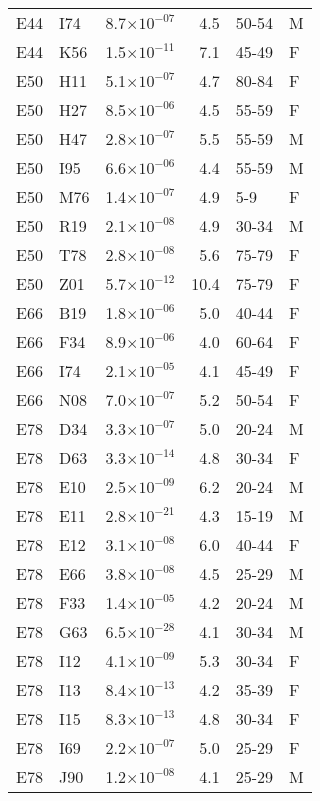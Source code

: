 \begin{longtable}{lllrll}
   E44 & I74 & 8.7$\times10^{-07}$ & 4.5 & 50-54 & M \\ 
   E44 & K56 & 1.5$\times10^{-11}$ & 7.1 & 45-49 & F \\ 
   E50 & H11 & 5.1$\times10^{-07}$ & 4.7 & 80-84 & F \\ 
   E50 & H27 & 8.5$\times10^{-06}$ & 4.5 & 55-59 & F \\ 
   E50 & H47 & 2.8$\times10^{-07}$ & 5.5 & 55-59 & M \\ 
   E50 & I95 & 6.6$\times10^{-06}$ & 4.4 & 55-59 & M \\ 
   E50 & M76 & 1.4$\times10^{-07}$ & 4.9 & 5-9 & F \\ 
   E50 & R19 & 2.1$\times10^{-08}$ & 4.9 & 30-34 & M \\ 
   E50 & T78 & 2.8$\times10^{-08}$ & 5.6 & 75-79 & F \\ 
   E50 & Z01 & 5.7$\times10^{-12}$ & 10.4 & 75-79 & F \\ 
   E66 & B19 & 1.8$\times10^{-06}$ & 5.0 & 40-44 & F \\ 
   E66 & F34 & 8.9$\times10^{-06}$ & 4.0 & 60-64 & F \\ 
   E66 & I74 & 2.1$\times10^{-05}$ & 4.1 & 45-49 & F \\ 
   E66 & N08 & 7.0$\times10^{-07}$ & 5.2 & 50-54 & F \\ 
   E78 & D34 & 3.3$\times10^{-07}$ & 5.0 & 20-24 & M \\ 
   E78 & D63 & 3.3$\times10^{-14}$ & 4.8 & 30-34 & F \\ 
   E78 & E10 & 2.5$\times10^{-09}$ & 6.2 & 20-24 & M \\ 
   E78 & E11 & 2.8$\times10^{-21}$ & 4.3 & 15-19 & M \\ 
   E78 & E12 & 3.1$\times10^{-08}$ & 6.0 & 40-44 & F \\ 
   E78 & E66 & 3.8$\times10^{-08}$ & 4.5 & 25-29 & M \\ 
   E78 & F33 & 1.4$\times10^{-05}$ & 4.2 & 20-24 & M \\ 
   E78 & G63 & 6.5$\times10^{-28}$ & 4.1 & 30-34 & M \\ 
   E78 & I12 & 4.1$\times10^{-09}$ & 5.3 & 30-34 & F \\ 
   E78 & I13 & 8.4$\times10^{-13}$ & 4.2 & 35-39 & F \\ 
   E78 & I15 & 8.3$\times10^{-13}$ & 4.8 & 30-34 & F \\ 
   E78 & I69 & 2.2$\times10^{-07}$ & 5.0 & 25-29 & F \\ 
   E78 & J90 & 1.2$\times10^{-08}$ & 4.1 & 25-29 & M \\ 

\end{longtable}
